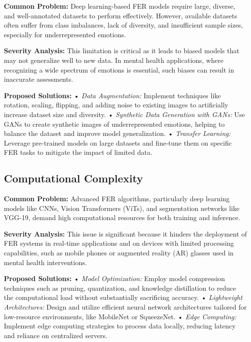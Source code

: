 \documentclass[lettersize,journal]{IEEEtran}
\begin{document}
\textbf{Common Problem:} Deep learning-based FER models require large, diverse, and well-annotated datasets to perform effectively. However, available datasets often suffer from class imbalances, lack of diversity, and insufficient sample sizes, especially for underrepresented emotions.

\textbf{Severity Analysis:} This limitation is critical as it leads to biased models that may not generalize well to new data. In mental health applications, where recognizing a wide spectrum of emotions is essential, such biases can result in inaccurate assessments.

\textbf{Proposed Solutions:}
	•	\emph{Data Augmentation:} Implement techniques like rotation, scaling, flipping, and adding noise to existing images to artificially increase dataset size and diversity.
	•	\emph{Synthetic Data Generation with GANs:} Use GANs to create synthetic images of underrepresented emotions, helping to balance the dataset and improve model generalization.
	•	\emph{Transfer Learning:} Leverage pre-trained models on large datasets and fine-tune them on specific FER tasks to mitigate the impact of limited data.

\subsection{Computational Complexity}

\textbf{Common Problem:} Advanced FER algorithms, particularly deep learning models like CNNs, Vision Transformers (ViTs), and segmentation networks like VGG-19, demand high computational resources for both training and inference.

\textbf{Severity Analysis:} This issue is significant because it hinders the deployment of FER systems in real-time applications and on devices with limited processing capabilities, such as mobile phones or augmented reality (AR) glasses used in mental health interventions.

\textbf{Proposed Solutions:}
	•	\emph{Model Optimization:} Employ model compression techniques such as pruning, quantization, and knowledge distillation to reduce the computational load without substantially sacrificing accuracy.
	•	\emph{Lightweight Architectures:} Design and utilize efficient neural network architectures tailored for low-resource environments, like MobileNet or SqueezeNet.
	•	\emph{Edge Computing:} Implement edge computing strategies to process data locally, reducing latency and reliance on centralized servers.
\end{document}
